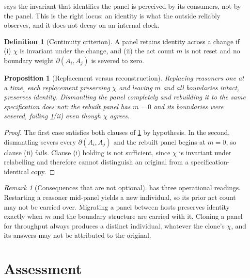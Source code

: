 \documentclass[11pt,twocolumn,a4paper]{article}
\theoremstyle{plain}
\newtheorem{proposition}[theorem]{Proposition}
\theoremstyle{definition}
\newtheorem{definition}[theorem]{Definition}
\theoremstyle{remark}
\newtheorem{remark}[theorem]{Remark}
\begin{document}
 says the invariant that identifies the panel is perceived
by its consumers, not by the panel. This is the right locus: an identity is what
the outside reliably observes, and it does not decay on an internal clock.

\begin{definition}[Continuity criterion]
\label{def:continuity}
A panel retains identity across a change if (i) $\chi$ is invariant under the
change, and (ii) the act count $m$ is not reset and no boundary weight
$\partial(A_i,A_j)$ is severed to zero.
\end{definition}

\begin{proposition}[Replacement versus reconstruction]
\label{prop:theseus}
Replacing reasoners one at a time, each replacement preserving $\chi$ and
leaving $m$ and all boundaries intact, preserves identity. Dismantling the panel
completely and rebuilding it to the same specification does not: the rebuilt
panel has $m = 0$ and its boundaries were severed, failing
\cref{def:continuity}(ii) even though $\chi$ agrees.
\end{proposition}

\begin{proof}
The first case satisfies both clauses of \cref{def:continuity} by hypothesis.
In the second, dismantling severs every $\partial(A_i,A_j)$ and the rebuilt
panel begins at $m=0$, so clause (ii) fails. Clause (i) holding is not
sufficient, since $\chi$ is invariant under relabelling and therefore cannot
distinguish an original from a specification-identical copy.
\end{proof}

\begin{remark}[Consequences that are not optional]
 has three operational readings. Restarting a reasoner
mid-panel yields a new individual, so its prior act count may not be carried
over. Migrating a panel between hosts preserves identity exactly when $m$ and
the boundary structure are carried with it. Cloning a panel for throughput
always produces a distinct individual, whatever the clone's $\chi$, and its
answers may not be attributed to the original.
\end{remark}

\part{Assessment}
\end{document}
